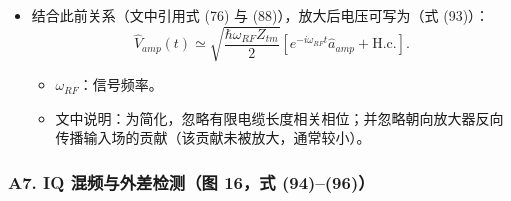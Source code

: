 \documentclass[12pt,a4paper,oneside]{ctexbook}
\providecommand{\tightlist}{%
  \setlength{\itemsep}{0pt}\setlength{\parskip}{0pt}}
\begin{document}
\begin{itemize}
\tightlist
\item
  结合此前关系（文中引用式 (76) 与 (88)），放大后电压可写为（式 (93)）：
  \[
  \hat{V}_{amp}(t)\simeq \sqrt{\frac{\hbar\omega_{RF}Z_{tm}}{2}}
  \left[e^{-i\omega_{RF}t}\hat{a}_{amp}+\mathrm{H.c.}\right].
  \]

  \begin{itemize}
  \tightlist
  \item
    \(\omega_{RF}\)：信号频率。
  \item
    文中说明：为简化，忽略有限电缆长度相关相位；并忽略朝向放大器反向传播输入场的贡献（该贡献未被放大，通常较小）。
  \end{itemize}
\end{itemize}


\subsubsection{A7. IQ 混频与外差检测（图 16，式
(94)--(96)）}\label{a7.-iq-ux6df7ux9891ux4e0eux5916ux5deeux68c0ux6d4bux56fe-16ux5f0f-9496}
\end{document}
